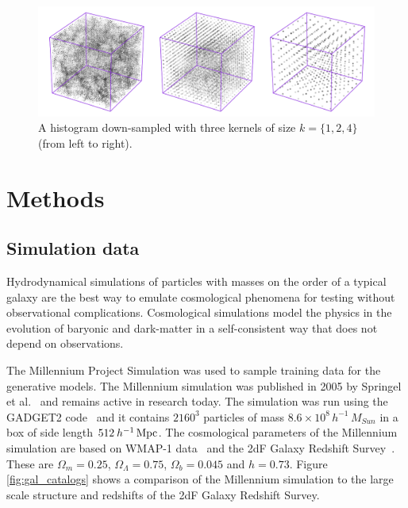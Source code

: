 \documentclass[twocolumn]{article}
\numberwithin{equation}{section}
\begin{document}
\begin{figure}[!ht]%
\includegraphics[width=\columnwidth]{figures/diagrams/kernel_fig.png}
\centering
\caption{A histogram down-sampled with three kernels of size $k=\{1, 2, 4\}$ (from left to right).}
\label{fig:kernel_fig}
\end{figure}


\section{Methods}\label{sec:methods}


\subsection{Simulation data}
Hydrodynamical simulations of particles with masses on the order of a typical galaxy are the best way to emulate 
cosmological phenomena for testing without observational complications. Cosmological simulations model the physics in 
the evolution of baryonic and dark-matter in a self-consistent way that does not depend on observations.

The Millennium Project Simulation was used to sample training data for the generative models. The Millennium simulation
was published in 2005 by Springel et al.~\cite{millsim} and remains active in research today. The simulation was run 
using the GADGET2 code~\cite{gadget2} and it contains $2160^3$ particles of mass $8.6 \times 10^8 \, h^{-1}  \, M_{Sun}$ 
in a box of side length $512  \: h^{-1} \,\textup{Mpc}$. The cosmological parameters of the Millennium simulation are 
based on WMAP-1 data~\cite{wmap1} and the 2dF Galaxy Redshift Survey~\cite{2df}. These are $\Omega_m=0.25$, 
$\Omega_{\Lambda}=0.75$, $\Omega_b=0.045$ and $h=0.73$. Figure \ref{fig:gal_catalogs} shows a comparison of the 
Millennium simulation to the large scale structure and redshifts of the 2dF Galaxy Redshift Survey. 
\end{document}
